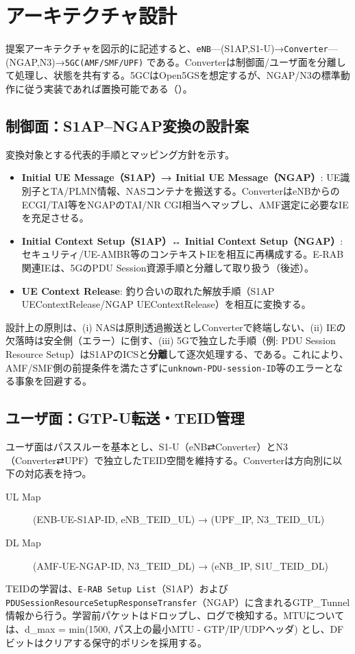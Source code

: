 \section{アーキテクチャ設計}
提案アーキテクチャを図示的に記述すると、\texttt{eNB}—(S1AP,S1-U)→\texttt{Converter}—(NGAP,N3)→\texttt{5GC(AMF/SMF/UPF)} である。Converterは制御面/ユーザ面を分離して処理し、状態を共有する。5GCはOpen5GS\cite{open5gs}を想定するが、NGAP/N3の標準動作に従う実装であれば置換可能である（\cite{threegpp-23501,threegpp-23502}）。

\subsection{制御面：S1AP–NGAP変換の設計案}
変換対象とする代表的手順とマッピング方針を示す。
\begin{itemize}
	\item \textbf{Initial UE Message（S1AP）→ Initial UE Message（NGAP）}: UE識別子とTA/PLMN情報、NASコンテナを搬送する。ConverterはeNBからのECGI/TAI等をNGAPのTAI/NR CGI相当へマップし、AMF選定に必要なIEを充足させる。
	\item \textbf{Initial Context Setup（S1AP）↔ Initial Context Setup（NGAP）}: セキュリティ/UE-AMBR等のコンテキストIEを相互に再構成する。E-RAB関連IEは、5GのPDU Session資源手順と分離して取り扱う（後述）。
	\item \textbf{UE Context Release}: 釣り合いの取れた解放手順（S1AP UEContextRelease/NGAP UEContextRelease）を相互に変換する。
\end{itemize}

設計上の原則は、(i) NASは原則透過搬送としConverterで終端しない、(ii) IEの欠落時は安全側（エラー）に倒す、(iii) 5Gで独立した手順（例: PDU Session Resource Setup）はS1APのICSと\textbf{分離}して逐次処理する、である。これにより、AMF/SMF側の前提条件を満たさずに\texttt{unknown-PDU-session-ID}等のエラーとなる事象を回避する。

\subsection{ユーザ面：GTP-U転送・TEID管理}
ユーザ面はパススルーを基本とし、S1-U（eNB⇄Converter）とN3（Converter⇄UPF）で独立したTEID空間を維持する。Converterは方向別に以下の対応表を持つ。
\begin{description}
	\item[UL Map] (ENB-UE-S1AP-ID, eNB\_TEID\_UL) → (UPF\_IP, N3\_TEID\_UL)
	\item[DL Map] (AMF-UE-NGAP-ID, N3\_TEID\_DL) → (eNB\_IP, S1U\_TEID\_DL)
\end{description}
TEIDの学習は、\texttt{E-RAB Setup List}（S1AP）および\texttt{PDUSessionResourceSetupResponseTransfer}（NGAP）に含まれるGTP\_Tunnel情報から行う。学習前パケットはドロップし、ログで検知する。MTUについては、d\_max = min(1500, パス上の最小MTU - GTP/IP/UDPヘッダ) とし、DFビットはクリアする保守的ポリシを採用する。

